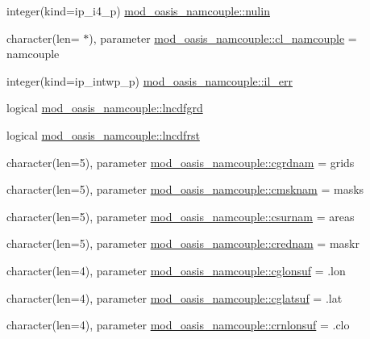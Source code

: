 \begin{DoxyCompactItemize}
integer(kind=ip\+\_\+i4\+\_\+p) \hyperlink{namespacemod__oasis__namcouple_a36ef9483c332254e38c52b1d78d26f1f}{mod\+\_\+oasis\+\_\+namcouple\+::nulin}
\item 
character(len= $\ast$), parameter \hyperlink{namespacemod__oasis__namcouple_ae023a43e29bb32ebf11f193e34d8bd85}{mod\+\_\+oasis\+\_\+namcouple\+::cl\+\_\+namcouple} = \textquotesingle{}namcouple\textquotesingle{}
\item 
integer(kind=ip\+\_\+intwp\+\_\+p) \hyperlink{namespacemod__oasis__namcouple_a18b7a14f095f3cb6ace40afc06e2a5b9}{mod\+\_\+oasis\+\_\+namcouple\+::il\+\_\+err}
\item 
logical \hyperlink{namespacemod__oasis__namcouple_a5d6add8b958acc8b865b898d9e54ac73}{mod\+\_\+oasis\+\_\+namcouple\+::lncdfgrd}
\item 
logical \hyperlink{namespacemod__oasis__namcouple_a645168dae20a0c24786c3e6dcea9f2ab}{mod\+\_\+oasis\+\_\+namcouple\+::lncdfrst}
\item 
character(len=5), parameter \hyperlink{namespacemod__oasis__namcouple_afaa0549951c43335a2f8e75c7b1d2846}{mod\+\_\+oasis\+\_\+namcouple\+::cgrdnam} = \textquotesingle{}grids\textquotesingle{}
\item 
character(len=5), parameter \hyperlink{namespacemod__oasis__namcouple_aeeda85bec8a449e87411d4ed404322c5}{mod\+\_\+oasis\+\_\+namcouple\+::cmsknam} = \textquotesingle{}masks\textquotesingle{}
\item 
character(len=5), parameter \hyperlink{namespacemod__oasis__namcouple_a49e79935fc2421fe3e4e7422f17b34ea}{mod\+\_\+oasis\+\_\+namcouple\+::csurnam} = \textquotesingle{}areas\textquotesingle{}
\item 
character(len=5), parameter \hyperlink{namespacemod__oasis__namcouple_a161fc23acf442c75c9d6ba7758937d59}{mod\+\_\+oasis\+\_\+namcouple\+::crednam} = \textquotesingle{}maskr\textquotesingle{}
\item 
character(len=4), parameter \hyperlink{namespacemod__oasis__namcouple_ac1a557cecb41295e7d5cb004a7937ea4}{mod\+\_\+oasis\+\_\+namcouple\+::cglonsuf} = \textquotesingle{}.lon\textquotesingle{}
\item 
character(len=4), parameter \hyperlink{namespacemod__oasis__namcouple_a2036218f05c62fc672bd07ece34f26db}{mod\+\_\+oasis\+\_\+namcouple\+::cglatsuf} = \textquotesingle{}.lat\textquotesingle{}
\item 
character(len=4), parameter \hyperlink{namespacemod__oasis__namcouple_ae56f031c6d9a819a39fe5170f42d7ce1}{mod\+\_\+oasis\+\_\+namcouple\+::crnlonsuf} = \textquotesingle{}.clo\textquotesingle{}

\end{DoxyCompactItemize}
